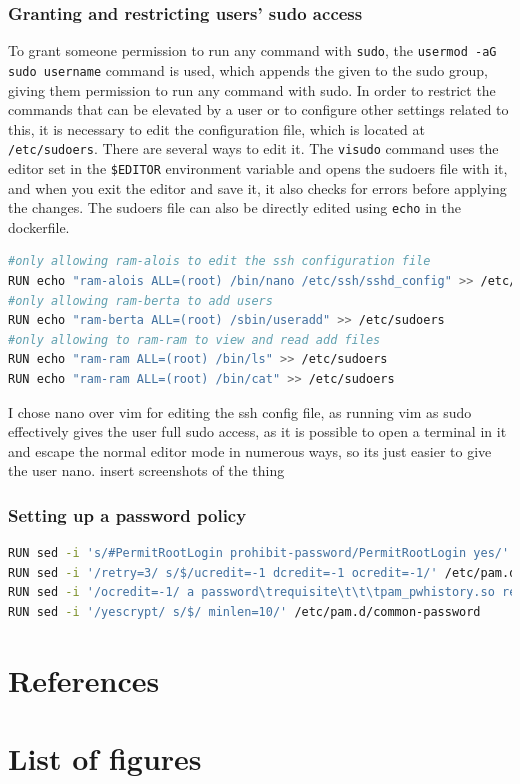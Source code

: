 \documentclass[a4paper]{article}
\newcommand{\abc}{\hfill \break}
\begin{document}
\subsubsection{Granting and restricting users' sudo access}
To grant someone permission to run any command with \texttt{sudo}, the \texttt{usermod -aG sudo username} command is used, which appends the given to the sudo group, giving them permission to run any command with sudo. \abc
In order to restrict the commands that can be elevated by a user or to configure other settings related to this, it is necessary to edit the configuration file, which is located at \texttt{/etc/sudoers}.\abc
There are several ways to edit it. The \texttt{visudo} command uses the editor set in the \texttt{\$EDITOR} environment variable and opens the sudoers file with it, and when you exit the editor and save it, it also checks for errors before applying the changes.
The sudoers file can also be directly edited using \texttt{echo} in the dockerfile.
\begin{lstlisting}[language=bash]
#only allowing ram-alois to edit the ssh configuration file
RUN echo "ram-alois ALL=(root) /bin/nano /etc/ssh/sshd_config" >> /etc/sudoers
#only allowing ram-berta to add users
RUN echo "ram-berta ALL=(root) /sbin/useradd" >> /etc/sudoers
#only allowing to ram-ram to view and read add files
RUN echo "ram-ram ALL=(root) /bin/ls" >> /etc/sudoers
RUN echo "ram-ram ALL=(root) /bin/cat" >> /etc/sudoers
\end{lstlisting}
I chose nano over vim for editing the ssh config file, as running vim as sudo effectively gives the user full sudo access, as it is possible to open a terminal in it and escape the normal editor mode in numerous ways, so its just easier to give the user nano.\abc
insert screenshots of the thing
\subsubsection{Setting up a password policy}

\begin{lstlisting}[language=bash]
RUN sed -i 's/#PermitRootLogin prohibit-password/PermitRootLogin yes/' /etc/ssh/sshd_config
RUN sed -i '/retry=3/ s/$/ucredit=-1 dcredit=-1 ocredit=-1/' /etc/pam.d/common-password
RUN sed -i '/ocredit=-1/ a password\trequisite\t\t\tpam_pwhistory.so remember=5 use_authtok' /etc/pam.d/common-password
RUN sed -i '/yescrypt/ s/$/ minlen=10/' /etc/pam.d/common-password
\end{lstlisting}

\newpage
\section{References}

\newpage
\section{List of figures}

\listoffigures
\end{document}
